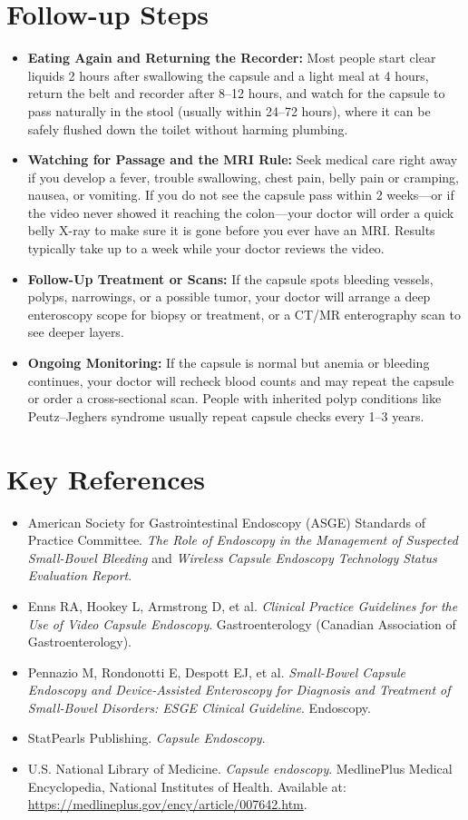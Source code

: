 \section{Follow-up Steps}
\begin{itemize}
    \item \textbf{Eating Again and Returning the Recorder:} Most people start clear liquids 2 hours after swallowing the capsule and a light meal at 4 hours, return the belt and recorder after 8--12 hours, and watch for the capsule to pass naturally in the stool (usually within 24--72 hours), where it can be safely flushed down the toilet without harming plumbing.
    \item \textbf{Watching for Passage and the MRI Rule:} Seek medical care right away if you develop a fever, trouble swallowing, chest pain, belly pain or cramping, nausea, or vomiting. If you do not see the capsule pass within 2 weeks---or if the video never showed it reaching the colon---your doctor will order a quick belly X-ray to make sure it is gone before you ever have an MRI. Results typically take up to a week while your doctor reviews the video.
    \item \textbf{Follow-Up Treatment or Scans:} If the capsule spots bleeding vessels, polyps, narrowings, or a possible tumor, your doctor will arrange a deep enteroscopy scope for biopsy or treatment, or a CT/MR enterography scan to see deeper layers.
    \item \textbf{Ongoing Monitoring:} If the capsule is normal but anemia or bleeding continues, your doctor will recheck blood counts and may repeat the capsule or order a cross-sectional scan. People with inherited polyp conditions like Peutz--Jeghers syndrome usually repeat capsule checks every 1--3 years.
\end{itemize}

\section{Key References}
\begin{itemize}
    \item American Society for Gastrointestinal Endoscopy (ASGE) Standards of Practice Committee. \textit{The Role of Endoscopy in the Management of Suspected Small-Bowel Bleeding} and \textit{Wireless Capsule Endoscopy Technology Status Evaluation Report}.
    \item Enns RA, Hookey L, Armstrong D, et al. \textit{Clinical Practice Guidelines for the Use of Video Capsule Endoscopy}. Gastroenterology (Canadian Association of Gastroenterology).
    \item Pennazio M, Rondonotti E, Despott EJ, et al. \textit{Small-Bowel Capsule Endoscopy and Device-Assisted Enteroscopy for Diagnosis and Treatment of Small-Bowel Disorders: ESGE Clinical Guideline}. Endoscopy.
    \item StatPearls Publishing. \textit{Capsule Endoscopy}.
    \item U.S. National Library of Medicine. \textit{Capsule endoscopy}. MedlinePlus Medical Encyclopedia, National Institutes of Health. Available at: \url{https://medlineplus.gov/ency/article/007642.htm}.
\end{itemize}

